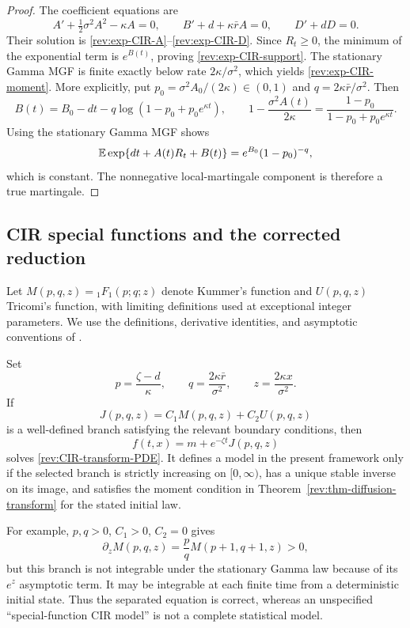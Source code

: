\begin{proof}
The coefficient equations are
\[
A'+\tfrac12\sigma^2A^2-\kappa A=0,
\qquad B'+d+\kappa\bar r A=0,
\qquad D'+dD=0.
\]
Their solution is \eqref{rev:exp-CIR-A}--\eqref{rev:exp-CIR-D}.  Since
$R_t\ge0$, the minimum of the exponential term is $e^{B(t)}$, proving
\eqref{rev:exp-CIR-support}.  The stationary Gamma MGF is finite exactly below
rate $2\kappa/\sigma^2$, which yields \eqref{rev:exp-CIR-moment}.  More
explicitly, put $p_0=\sigma^2A_0/(2\kappa)\in(0,1)$ and
$q=2\kappa\bar r/\sigma^2$.  Then
\[
B(t)=B_0-dt-q\log(1-p_0+p_0e^{\kappa t}),
\qquad
1-\frac{\sigma^2A(t)}{2\kappa}
=\frac{1-p_0}{1-p_0+p_0e^{\kappa t}}.
\]
Using the stationary Gamma MGF shows
\[
\mathbb E\exp\{dt+A(t)R_t+B(t)\}=e^{B_0}(1-p_0)^{-q},
\]
which is constant.  The nonnegative local-martingale component is therefore a
true martingale.
\end{proof}

\subsection{CIR special functions and the corrected reduction}

Let $M(p,q,z)={}_1F_1(p;q;z)$ denote Kummer's function and $U(p,q,z)$
Tricomi's function, with limiting definitions used at exceptional integer
parameters.  We use the definitions, derivative identities, and asymptotic
conventions of \citet[Chapter~13]{OlverEtAl2010}.

\begin{proposition}
\label{rev:prop-CIR-Kummer}
Set
\begin{equation}
p=\frac{\zeta-d}{\kappa},\qquad
q=\frac{2\kappa\bar r}{\sigma^2},\qquad
z=\frac{2\kappa x}{\sigma^2}.
\label{rev:CIR-Kummer-parameters}
\end{equation}
If
\begin{equation}
J(p,q,z)=C_1M(p,q,z)+C_2U(p,q,z)
\label{rev:CIR-Kummer-branch}
\end{equation}
is a well-defined branch satisfying the relevant boundary conditions, then
\begin{equation}
f(t,x)=m+e^{-\zeta t}J(p,q,z)
\label{rev:CIR-Kummer-transform}
\end{equation}
solves \eqref{rev:CIR-transform-PDE}.  It defines a model in the present
framework only if the selected branch is strictly increasing on $[0,\infty)$,
has a unique stable inverse on its image, and satisfies the moment condition in
Theorem~\ref{rev:thm-diffusion-transform} for the stated initial law.

For example, $p,q>0$, $C_1>0$, $C_2=0$ gives
\begin{equation}
\partial_zM(p,q,z)=\frac pqM(p+1,q+1,z)>0,
\label{rev:Kummer-M-derivative}
\end{equation}
but this branch is not integrable under the stationary Gamma law because of its
$e^z$ asymptotic term.  It may be integrable at each finite time from a
deterministic initial state.  Thus the separated equation is correct, whereas
an unspecified ``special-function CIR model'' is not a complete statistical
model.
\end{proposition}

